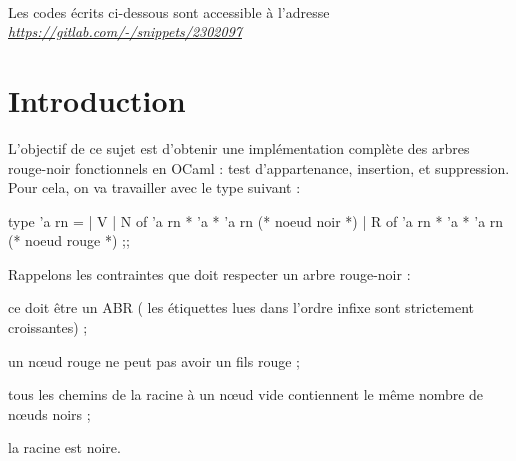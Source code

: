 \documentclass[a4paper,french,bookmarks]{article}
\newcommand{\rouge}{{\color{main9} rouge}}
\begin{document}

\hfill\\[-35pt]
\begin{center}
    \begin{minipage}{0.8\linewidth}
        \begin{tcolorbox}[
            breakable,
            enhanced,
            interior style      = {left color=main4!15,right color=main2!12},
            borderline north    = {.5pt}{0pt}{main2!10},
            borderline south    = {.5pt}{0pt}{main2!10},
            borderline west     = {.5pt}{0pt}{main2!10},
            borderline east     = {.5pt}{0pt}{main2!10},
            sharp corners       = downhill,
            arc                 = 0 cm,
            boxrule             = 0.5pt,
            drop fuzzy shadow   = black!40!white,
            nobeforeafter,
        ]
        \centering\GillSansMT Les codes écrits ci-dessous sont accessible à l'adresse \textit{\color{main2}\href{https://gitlab.com/-/snippets/2302097}{https://gitlab.com/-/snippets/2302097}}
    \end{tcolorbox}
\end{minipage}
\end{center}

\section{Introduction}

L'objectif de ce sujet est d'obtenir une implémentation complète des arbres \rouge{}-noir fonctionnels en OCaml : test d'appartenance, insertion, et suppression. Pour cela, on va travailler avec le type suivant :

\begin{ocaml}
type 'a rn =
    | V
    | N of 'a rn * 'a * 'a rn (* noeud noir *)
    | R of 'a rn * 'a * 'a rn (* noeud rouge *)
;;
\end{ocaml}
    
Rappelons les contraintes que doit respecter un arbre \rouge{}-noir :

\begin{enumerate}
    \ithand ce doit être un ABR (\ie{} les étiquettes lues dans l'ordre infixe sont strictement croissantes) ;
    
    \ithand un nœud \rouge{} ne peut pas avoir un fils \rouge{} ;
    
    \ithand tous les chemins de la racine à un nœud vide contiennent le même nombre de nœuds noirs ;
    
    \ithand la racine est noire.
\end{enumerate}
\end{document}
